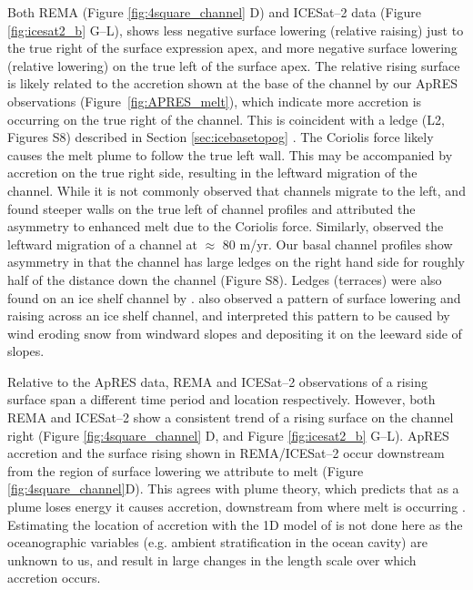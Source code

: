 Both REMA (Figure \ref{fig:4square_channel} D) and ICESat--2 data (Figure \ref{fig:icesat2_b} G--L),  shows less negative surface lowering (relative raising) just to the true right of the surface expression apex, and more negative surface lowering (relative lowering) on the true left of the surface apex. 
The relative rising surface is likely related to the accretion shown at the base of the channel by our ApRES observations (Figure~\ref{fig:APRES_melt}), which indicate more accretion is occurring on the true right of the channel. This  is coincident with a ledge (L2, Figures S8) described in Section \ref{sec:icebasetopog} . 
The Coriolis force likely causes the melt plume to follow the true left wall. This may be accompanied by accretion on the true right side, resulting in the leftward migration of the channel.   While it is not commonly observed that channels migrate to the left, \cite{gourmelen2017channelized} and \cite{alley2016impacts} found steeper walls on the true left of channel profiles and attributed the asymmetry to enhanced melt due to the Coriolis force. Similarly, \cite{chartrand2020basal} observed the leftward migration of a channel at $\approx$ 80 m/yr.
Our basal channel profiles show asymmetry in that the channel has large ledges on the right hand side for roughly half of the distance down the channel (Figure S8). Ledges (terraces) were also found on an ice shelf channel by \cite{dutrieux2014basal}.  \cite{drews2020atmospheric} also observed a pattern of surface lowering and raising across an ice shelf channel, and interpreted this pattern to be caused by wind eroding snow from windward slopes and depositing it on the leeward side of slopes. 

Relative to the ApRES data, REMA and ICESat--2 observations of a rising surface span a different time period and location respectively. However, both REMA and ICESat--2 show a consistent trend of a rising surface on the channel right (Figure \ref{fig:4square_channel} D, and Figure \ref{fig:icesat2_b} G--L). ApRES accretion and the surface rising shown in REMA/ICESat--2 occur downstream from the region of surface lowering we attribute to melt (Figure \ref{fig:4square_channel}D). This agrees with plume theory, which predicts that as a plume loses energy it causes accretion, downstream from where melt is occurring \cite{jenkins1991one}. Estimating the location of accretion with the 1D model of \cite{jenkins2011convection} is not done here as the oceanographic variables (e.g. ambient stratification in the ocean cavity) are unknown to us, and result in large changes in the length scale over which accretion occurs. 

